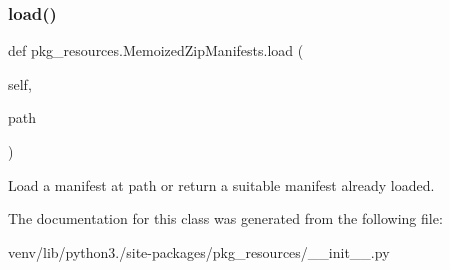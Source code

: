 \subsubsection{\texorpdfstring{load()}{load()}}
{\footnotesize\ttfamily def pkg\+\_\+resources.\+Memoized\+Zip\+Manifests.\+load (\begin{DoxyParamCaption}\item[{}]{self,  }\item[{}]{path }\end{DoxyParamCaption})}

\begin{DoxyVerb}Load a manifest at path or return a suitable manifest already loaded.
\end{DoxyVerb}
 

The documentation for this class was generated from the following file\+:\begin{DoxyCompactItemize}
\item 
venv/lib/python3./site-\/packages/pkg\+\_\+resources/\+\_\+\+\_\+init\+\_\+\+\_\+.\+py\end{DoxyCompactItemize}
